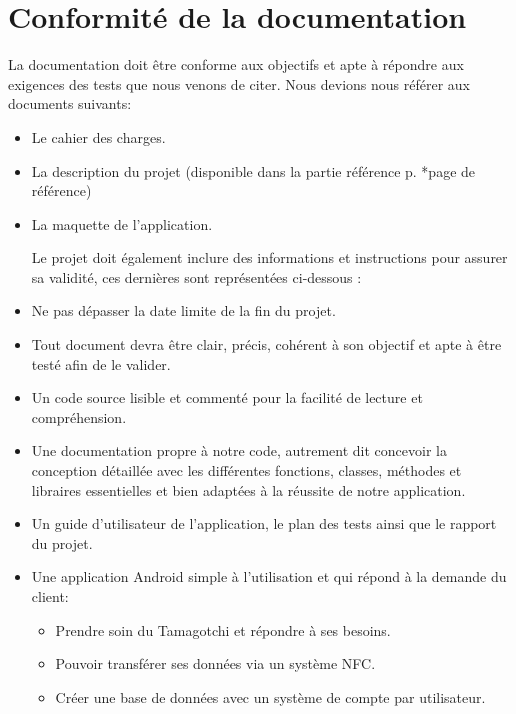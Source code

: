 \documentclass{cahier_de_recette}
\begin{document}
\section{Conformité de la documentation}
La documentation doit être conforme aux objectifs et apte à répondre aux exigences des tests que nous venons de citer. Nous devions nous référer aux documents suivants: 
\begin{itemize}[label=\textbullet]
\item Le cahier des charges.
\item La description du projet (disponible dans la partie référence p. *page de référence)
\item La maquette de l’application.

Le projet doit également inclure des informations et instructions pour assurer sa validité, ces dernières sont représentées ci-dessous : 
\item Ne pas dépasser la date limite de la fin du projet.
\item Tout document devra être clair, précis, cohérent à son objectif et apte à être testé afin de le valider. 
\item Un code source lisible et commenté pour la facilité de lecture et compréhension.
\item Une documentation propre à notre code, autrement dit concevoir la conception détaillée avec les différentes fonctions, classes, méthodes et libraires essentielles et bien adaptées à la réussite de notre application.
\item Un guide d’utilisateur de l’application, le plan des tests ainsi que le rapport du projet.
\item Une application Android simple à l’utilisation et qui répond à la demande du client: 
\begin{itemize}[label=\textendash]
\item Prendre soin du Tamagotchi et répondre à ses besoins.
\item Pouvoir transférer ses données via un système NFC.
\item Créer une base de données avec un système de compte par utilisateur.
\end{itemize}
\end{itemize}
\end{document}
